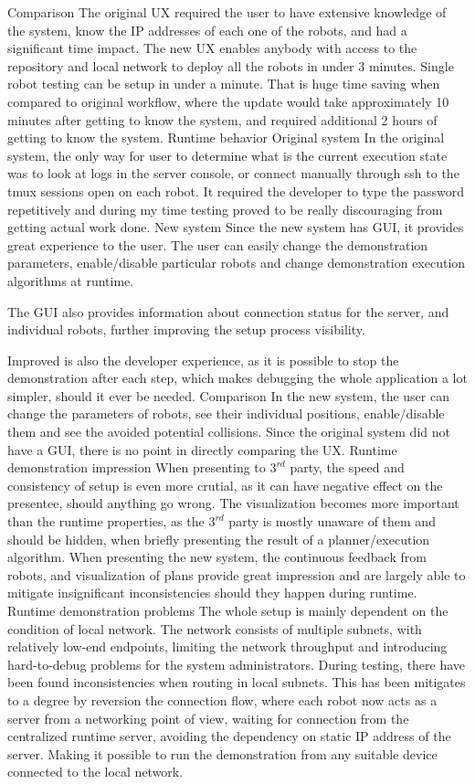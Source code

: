 \secc Comparison
The original UX required the user to have extensive knowledge of the system, know the IP addresses of each one of the robots, and had a significant time impact. The new UX enables anybody with access to the repository and local network to deploy all the robots in under 3 minutes. Single robot testing can be setup in under a minute. That is huge time saving when compared to original workflow, where the update would take approximately 10 minutes after getting to know the system, and required additional 2 hours of getting to know the system.
\sec Runtime behavior
\secc Original system
In the original system, the only way for user to determine what is the current execution state was to look at logs in the server console, or connect manually through ssh to the tmux sessions open on each robot. It required the developer to type the password repetitively and during my time testing proved to be really discouraging from getting actual work done.
\secc New system
Since the new system has GUI, it provides great experience to the user. The user can easily change the demonstration parameters, enable/disable particular robots and change demonstration execution algorithms at runtime.

The GUI also provides information about connection status for the server, and individual robots, further improving the setup process visibility.

Improved is also the developer experience, as it is possible to stop the demonstration after each step, which makes debugging the whole application a lot simpler, should it ever be needed.
\secc Comparison
In the new system, the user can change the parameters of robots, see their individual positions, enable/disable them and see the avoided potential collisions. Since the original system did not have a GUI, there is no point in directly comparing the UX. 
\sec Runtime demonstration impression
When presenting to $3^{rd}$ party, the speed and consistency of setup is even more crutial, as it can have negative effect on the presentee, should anything go wrong. The visualization becomes more important than the runtime properties, as the $3^{rd}$ party is mostly unaware of them and should be hidden, when briefly presenting the result of a planner/execution algorithm. When presenting the new system, the continuous feedback from robots, {\vicon} and visualization of plans provide great impression and are largely able to mitigate insignificant inconsistencies should they happen during runtime.
\sec Runtime demonstration problems
The whole setup is mainly dependent on the condition of local network. The network consists of multiple subnets, with relatively low-end endpoints, limiting the network throughput and introducing hard-to-debug problems for the system administrators. During testing, there have been found inconsistencies when routing in local subnets. This has been mitigates to a degree by reversion the connection flow, where each robot now acts as a server from a networking point of view, waiting for connection from the centralized runtime server, avoiding the dependency on static IP address of the server. Making it possible to run the demonstration from any suitable device connected to the local network.